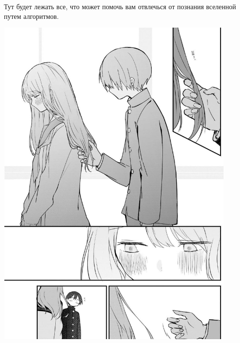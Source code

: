 Тут будет лежать все, что может помочь вам отвлечься от познания вселенной путем алгоритмов.
\begin{center}
  \includegraphics[width=12cm, height=17cm]{MyLoveImages/myLoveLove.jpg}
\end{center}